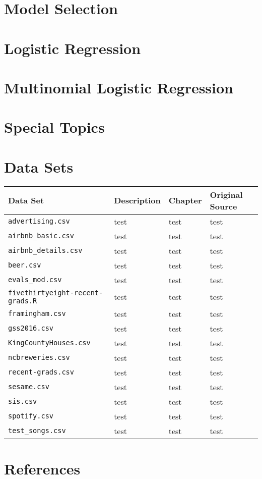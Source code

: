 \documentclass[]{book}
\begin{document}
\chapter{Model Selection}\label{select}

\chapter{Logistic Regression}\label{logistic}

\chapter{Multinomial Logistic Regression}\label{multinom-logistic}

\chapter{Special Topics}\label{special}

\chapter{Data Sets}\label{data}

\begin{longtable}[]{@{}llll@{}}
\toprule
Data Set & Description & Chapter & Original Source\tabularnewline
\midrule
\endhead
\texttt{advertising.csv} & test & test & test\tabularnewline
\texttt{airbnb\_basic.csv} & test & test & test\tabularnewline
\texttt{airbnb\_details.csv} & test & test & test\tabularnewline
\texttt{beer.csv} & test & test & test\tabularnewline
\texttt{evals\_mod.csv} & test & test & test\tabularnewline
\texttt{fivethirtyeight-recent-grads.R} & test & test &
test\tabularnewline
\texttt{framingham.csv} & test & test & test\tabularnewline
\texttt{gss2016.csv} & test & test & test\tabularnewline
\texttt{KingCountyHouses.csv} & test & test & test\tabularnewline
\texttt{ncbreweries.csv} & test & test & test\tabularnewline
\texttt{recent-grads.csv} & test & test & test\tabularnewline
\texttt{sesame.csv} & test & test & test\tabularnewline
\texttt{sis.csv} & test & test & test\tabularnewline
\texttt{spotify.csv} & test & test & test\tabularnewline
\texttt{test\_songs.csv} & test & test & test\tabularnewline
\bottomrule
\end{longtable}

\chapter{References}\label{refs}


\end{document}
